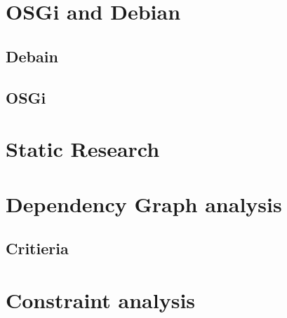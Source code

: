 
\section{OSGi and Debian}

\subsection{Debain}


\subsection{OSGi}

\section{Static Research}


\section{Dependency Graph analysis}

\subsection{Critieria}




\section{Constraint analysis}

